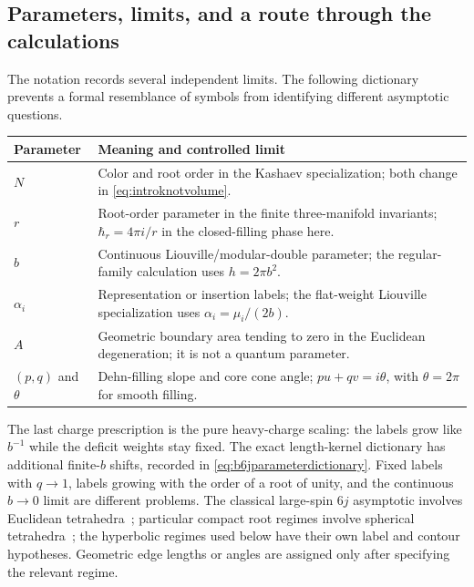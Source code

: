 \documentclass[11pt,a4paper]{article}
\numberwithin{equation}{section}
\theoremstyle{definition}
\theoremstyle{remark}
\begin{document}
\subsection{Parameters, limits, and a route through the calculations}
\label{sec:introreadingguide}

The notation records several independent limits. The following
dictionary prevents a formal resemblance of symbols from
identifying different asymptotic questions.
\begin{center}
\small
\begin{tabular}{@{}>{\raggedright\arraybackslash}p{}>{\raggedright\arraybackslash}p{}@{}}
\toprule
Parameter & Meaning and controlled limit\\
\midrule
$N$ & Color and root order in the Kashaev specialization;
both change in \eqref{eq:introknotvolume}.\\[4pt]
$r$ & Root-order parameter in the finite three-manifold
invariants; $\hbar_r=4\pi i/r$ in the closed-filling phase here.\\[4pt]
$b$ & Continuous Liouville/modular-double parameter;
the regular-family calculation uses $h=2\pi b^2$.\\[4pt]
$\alpha_i$ & Representation or insertion labels; the flat-weight
Liouville specialization uses $\alpha_i=\mu_i/(2b)$.\\[4pt]
$A$ & Geometric boundary area tending to zero in the
Euclidean degeneration; it is not a quantum parameter.\\[4pt]
$(p,q)$ and $\theta$ & Dehn-filling slope and core cone angle;
$pu+qv=i\theta$, with $\theta=2\pi$ for smooth filling.\\
\bottomrule
\end{tabular}
\end{center}
The last charge prescription is the pure heavy-charge scaling:
the labels grow like $b^{-1}$ while the deficit weights stay fixed.
The exact length-kernel dictionary has additional finite-$b$
shifts, recorded in \eqref{eq:b6jparameterdictionary}.
Fixed labels with $q\to1$, labels growing with the order of a root
of unity, and the continuous $b\to0$ limit are different problems.
The classical large-spin $6j$ asymptotic involves Euclidean
tetrahedra~\cite{Roberts}; particular compact root regimes involve
spherical tetrahedra~\cite{TaylorWoodward}; the hyperbolic regimes
used below have their own label and contour hypotheses. Geometric
edge lengths or angles are assigned only after specifying the
relevant regime.
\end{document}
